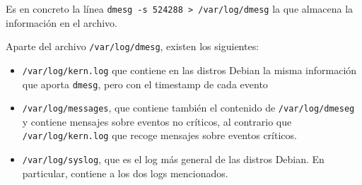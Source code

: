 \documentclass[a4paper,10pt]{article}
\newenvironment{answer}{%
\begin{list}{}{%
}%
\item[]}{\end{list}}
\begin{document}
\begin{answer}
\begin{enumerate}
Es en concreto la línea \texttt{dmesg -s 524288 > /var/log/dmesg} la que almacena la información en el archivo.

Aparte del archivo \texttt{/var/log/dmesg}, existen los siguientes:
\begin{itemize}
 \item \texttt{/var/log/kern.log} que contiene en las distros Debian la misma información que aporta \texttt{dmesg},
 pero con el timestamp de cada evento
 \item \texttt{/var/log/messages}, que contiene también el contenido de \texttt{/var/log/dmeseg} y contiene
 mensajes sobre eventos no críticos, al contrario que \texttt{/var/log/kern.log} que recoge mensajes sobre eventos
 críticos.
 \item \texttt{/var/log/syslog}, que es el log más general de las distros Debian. En particular, contiene a los dos logs
 mencionados.
\end{itemize}

\cite{dmesg} \cite{syslog}

 \end{enumerate}

\end{answer}
        
\end{document}
